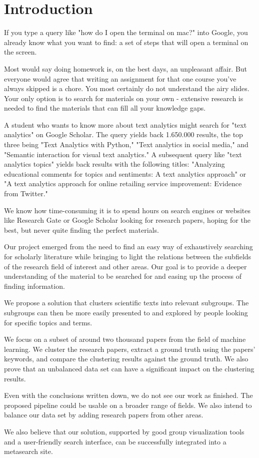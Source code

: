 \section{Introduction}

If you type a query like "how do I open the terminal on mac?" into Google, you already know what you want to find: a set of steps that will open a terminal on the screen.

Most would say doing homework is, on the best days, an unpleasant affair. But everyone would agree that writing an assignment for that one course you've always skipped is a chore. You most certainly do not understand the airy slides. Your only option is to search for materials on your own - extensive research is needed to find the materials that can fill all your knowledge gaps.

A student who wants to know more about text analytics might search for "text analytics" on Google Scholar. The query yields back 1.650.000 results, the top three being "Text Analytics with Python," "Text analytics in social media," and "Semantic interaction for visual text analytics." A subsequent query like "text analytics topics" yields back results with the following titles: "Analyzing educational comments for topics and sentiments: A text analytics approach" or "A text analytics approach for online retailing service improvement: Evidence from Twitter."

We know how time-consuming it is to spend hours on search engines or websites like Research Gate or Google Scholar looking for research papers, hoping for the best, but never quite finding the perfect materials.

Our project emerged from the need to find an easy way of exhaustively searching for scholarly literature while bringing to light the relations between the subfields of the research field of interest and other areas. Our goal is to provide a deeper understanding of the material to be searched for and easing up the process of finding information.

We propose a solution that clusters scientific texts into relevant subgroups. The subgroups can then be more easily presented to and explored by people looking for specific topics and terms.

We focus on a subset of around two thousand papers from the field of machine learning. We cluster the research papers, extract a ground truth using the papers' keywords, and compare the clustering results against the ground truth. We also prove that an unbalanced data set can have a significant impact on the clustering results. 

Even with the conclusions written down, we do not see our work as finished. The proposed pipeline could be usable on a broader range of fields. We also intend to balance our data set by adding research papers from other areas.

We also believe that our solution, supported by good group visualization tools and a user-friendly search interface, can be successfully integrated into a metasearch site.